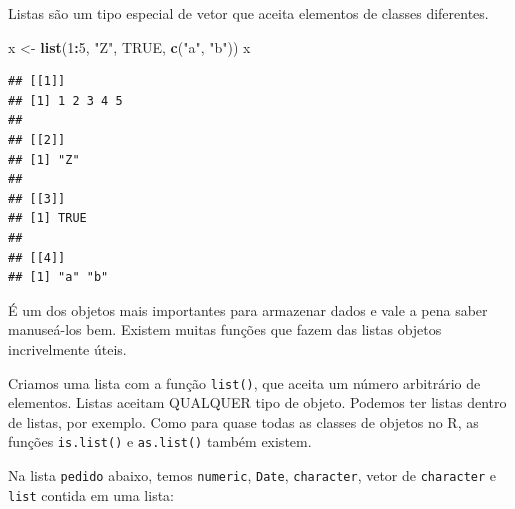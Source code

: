 \documentclass[
]{book}
\newenvironment{Shaded}{\begin{snugshade}}{\end{snugshade}}
\newcommand{\DecValTok}[1]{\textcolor[rgb]{0.00,0.00,0.81}{#1}}
\newcommand{\KeywordTok}[1]{\textcolor[rgb]{0.13,0.29,0.53}{\textbf{#1}}}
\newcommand{\NormalTok}[1]{#1}
\newcommand{\OperatorTok}[1]{\textcolor[rgb]{0.81,0.36,0.00}{\textbf{#1}}}
\newcommand{\OtherTok}[1]{\textcolor[rgb]{0.56,0.35,0.01}{#1}}
\newcommand{\StringTok}[1]{\textcolor[rgb]{0.31,0.60,0.02}{#1}}
\begin{document}
Listas são um tipo especial de vetor que aceita elementos de classes diferentes.

\begin{Shaded}
\begin{Highlighting}[]
\NormalTok{x <{-}}\StringTok{ }\KeywordTok{list}\NormalTok{(}\DecValTok{1}\OperatorTok{:}\DecValTok{5}\NormalTok{, }\StringTok{"Z"}\NormalTok{, }\OtherTok{TRUE}\NormalTok{, }\KeywordTok{c}\NormalTok{(}\StringTok{"a"}\NormalTok{, }\StringTok{"b"}\NormalTok{))}
\NormalTok{x}
\end{Highlighting}
\end{Shaded}

\begin{verbatim}
## [[1]]
## [1] 1 2 3 4 5
## 
## [[2]]
## [1] "Z"
## 
## [[3]]
## [1] TRUE
## 
## [[4]]
## [1] "a" "b"
\end{verbatim}

É um dos objetos mais importantes para armazenar dados e vale a pena saber manuseá-los bem. Existem muitas funções que fazem das listas objetos incrivelmente úteis.

Criamos uma lista com a função \texttt{list()}, que aceita um número arbitrário de elementos. Listas aceitam QUALQUER tipo de objeto. Podemos ter listas dentro de listas, por exemplo. Como para quase todas as classes de objetos no R, as funções \texttt{is.list()} e \texttt{as.list()} também existem.

Na lista \texttt{pedido} abaixo, temos \texttt{numeric}, \texttt{Date}, \texttt{character}, vetor de \texttt{character} e \texttt{list} contida em uma lista:
\end{document}
